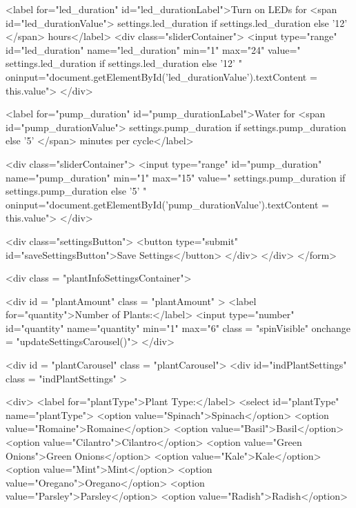 \documentclass[12pt]{article} %
\begin{document}
\begin{htmlcode}[caption={Settings Page HTML}]
            
            <label for="led_duration" id="led_durationLabel">Turn on LEDs for <span id="led_durationValue">{{ settings.led_duration if settings.led_duration else '12' }}</span> hours</label>
            <div class="sliderContainer">
                <input type="range" id="led_duration" name="led_duration" min="1" max="24" value="{{ settings.led_duration if settings.led_duration else '12' }}" oninput="document.getElementById('led_durationValue').textContent = this.value">
            </div>
    
            <label for="pump_duration" id="pump_durationLabel">Water for <span id="pump_durationValue">{{ settings.pump_duration if settings.pump_duration else '5' }}</span> minutes per cycle</label>

            <div class="sliderContainer">
                <input type="range" id="pump_duration" name="pump_duration" min="1" max="15" value="{{ settings.pump_duration if settings.pump_duration else '5' }}" oninput="document.getElementById('pump_durationValue').textContent = this.value">
            </div>
    
            <div class="settingsButton">
                <button type="submit" id="saveSettingsButton">Save Settings</button>
            </div>
        </div>
    </form>
    
    <div class = "plantInfoSettingsContainer">
    
        <div id = "plantAmount" class = "plantAmount" >
            <label for="quantity">Number of Plants:</label>
            <input type="number" id="quantity" name="quantity" min="1" max="6" class = "spinVisible" onchange = "updateSettingsCarousel()">
        </div>

        <div id = "plantCarousel" class = "plantCarousel">
            <div id="indPlantSettings" class = "indPlantSettings" >

                <div>
                    <label for="plantType">Plant Type:</label>
                    <select id="plantType" name="plantType">
                            <option value="Spinach">Spinach</option>
                            <option value="Romaine">Romaine</option>
                            <option value="Basil">Basil</option>
                            <option value="Cilantro">Cilantro</option>
                            <option value="Green Onions">Green Onions</option>
                            <option value="Kale">Kale</option>
                            <option value="Mint">Mint</option>
                            <option value="Oregano">Oregano</option>
                            <option value="Parsley">Parsley</option>
                            <option value="Radish">Radish</option>


\end{htmlcode}
\end{document}
